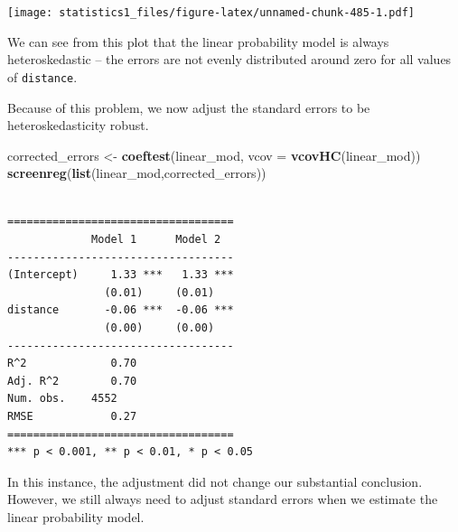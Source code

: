 \documentclass[]{article}
\newenvironment{Shaded}{\begin{snugshade}}{\end{snugshade}}
\newcommand{\KeywordTok}[1]{\textcolor[rgb]{0.13,0.29,0.53}{\textbf{#1}}}
\newcommand{\DataTypeTok}[1]{\textcolor[rgb]{0.13,0.29,0.53}{#1}}
\newcommand{\DecValTok}[1]{\textcolor[rgb]{0.00,0.00,0.81}{#1}}
\newcommand{\StringTok}[1]{\textcolor[rgb]{0.31,0.60,0.02}{#1}}
\newcommand{\OperatorTok}[1]{\textcolor[rgb]{0.81,0.36,0.00}{\textbf{#1}}}
\newcommand{\NormalTok}[1]{#1}
\theoremstyle{definition}
\theoremstyle{definition}
\theoremstyle{definition}
\theoremstyle{remark}
\begin{document}
\begin{Shaded}
\end{Shaded}

\texttt{[image: statistics1\_files/figure-latex/unnamed-chunk-485-1.pdf]}

We can see from this plot that the linear probability model is always
heteroskedastic -- the errors are not evenly distributed around zero for
all values of \texttt{distance}.

Because of this problem, we now adjust the standard errors to be
heteroskedasticity robust.

\begin{Shaded}
\begin{Highlighting}[]
\NormalTok{corrected_errors <-}\StringTok{ }\KeywordTok{coeftest}\NormalTok{(linear_mod, }\DataTypeTok{vcov =} \KeywordTok{vcovHC}\NormalTok{(linear_mod))}
\KeywordTok{screenreg}\NormalTok{(}\KeywordTok{list}\NormalTok{(linear_mod,corrected_errors))}
\end{Highlighting}
\end{Shaded}

\begin{verbatim}

===================================
             Model 1      Model 2  
-----------------------------------
(Intercept)     1.33 ***   1.33 ***
               (0.01)     (0.01)   
distance       -0.06 ***  -0.06 ***
               (0.00)     (0.00)   
-----------------------------------
R^2             0.70               
Adj. R^2        0.70               
Num. obs.    4552                  
RMSE            0.27               
===================================
*** p < 0.001, ** p < 0.01, * p < 0.05
\end{verbatim}

In this instance, the adjustment did not change our substantial
conclusion. However, we still always need to adjust standard errors when
we estimate the linear probability model.
\end{document}
